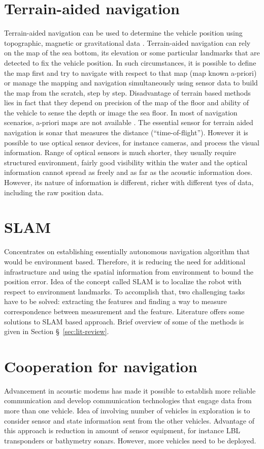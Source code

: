 \section{Terrain-aided navigation} \label{sec:terrain-aided}
Terrain-aided navigation can be used to determine the vehicle position using topographic, magnetic or gravitational data \cite{kinsey06}. Terrain-aided navigation can rely on the map of the sea bottom, its elevation or some particular landmarks that are detected to fix the vehicle position. In such circumstances, it is possible to define the map first and try to navigate with respect to that map (map known a-priori) or manage the mapping and navigation simultaneously using sensor data to build the map from the scratch, step by step. Disadvantage of terrain based methods lies in fact that they depend on precision of the map of the floor and ability of the vehicle to sense the depth or image the sea floor. In most of navigation scenarios, a-priori maps are not available \cite{kinsey06}.
The essential sensor for terrain aided navigation is sonar that measures the distance (``time-of-flight''). However it is possible to use optical sensor devices, for instance cameras, and process the visual information. Range of optical sensors is much shorter, they usually require structured environment, fairly good visibility within the water and the optical information cannot spread as freely and as far as the acoustic information does. However, its nature of information is different, richer with different tyes of data, including the raw position data. 
\section{SLAM} \label{sec:slam}
Concentrates on establishing essentially autonomous navigation algorithm that would be environment based. Therefore, it is reducing the need for additional infrastructure and using the spatial information from environment to bound the position error. Idea of the concept called SLAM is to localize the robot with respect to environment landmarks. To accomplish that, two challenging tasks have to be solved: extracting the features and finding a way to measure correspondence between measurement and the feature. Literature offers some solutions to SLAM based approach. Brief overview of some of the methods is given in Section \S~\ref{sec:lit-review}. 
\section{Cooperation for navigation} \label{sec:cooperation}
Advancement in acoustic modems has made it possible to establish more reliable communication and develop communication technologies that engage data from more than one vehicle. Idea of involving number of vehicles in exploration is to consider sensor and state information sent from the other vehicles. Advantage of this approach is reduction in amount of sensor equipment, for instance LBL transponders or bathymetry sonars. However, more vehicles need to be deployed. 
